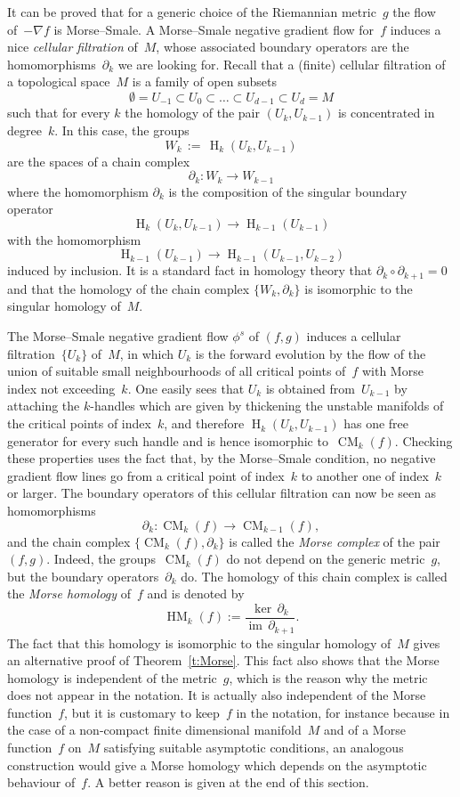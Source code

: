 \documentclass[12pt,twoside]{amsart}
\theoremstyle{plain}
\numberwithin{figure}{section}
\numberwithin{equation}{section}
\def\im{\operatorname {im}}
\def\H{\operatorname{H}}
\def\CM{\operatorname{CM}}
\def\HM{\operatorname{HM}}
\begin{document}
It can be proved that for a generic choice of the Riemannian metric~$g$ the flow of~$-\nabla f$ is Morse--Smale. A Morse--Smale negative gradient flow for~$f$ induces a nice {\em cellular filtration}\/ of~$M$, whose associated boundary operators are the homomorphisms~$\partial_k$ 
we are looking for. Recall that a (finite) cellular filtration of a topological space~$M$ is a family of open subsets 
\[
\emptyset = U_{-1} \subset U_0 \subset \dots \subset U_{d-1} \subset U_d = M
\]
such that for every $k$ the homology of the pair $(U_k,U_{k-1})$ is concentrated in degree~$k$. In this case, the groups
\[
W_k \,:=\, \H_k(U_k,U_{k-1})
\]
are the spaces of a chain complex
\[
\partial_k \colon W_k \rightarrow W_{k-1}
\]
where the homomorphism $\partial_k$ is the composition of the singular boundary operator
\[
\H_k(U_k,U_{k-1}) \rightarrow \H_{k-1}(U_{k-1})
\]
with the homomorphism
\[
\H_{k-1}(U_{k-1}) \rightarrow \H_{k-1}(U_{k-1},U_{k-2})
\]
induced by inclusion. It is a standard fact in homology theory that 
$\partial_k \circ \partial_{k+1}=0$ and that the homology of the chain complex 
$\{W_k,\partial_k\}$ is isomorphic to the singular homology of~$M$.

The Morse--Smale negative gradient flow $\phi^s$ of $(f,g)$ induces a
cellular filtration~$\{U_k\}$ of~$M$, in which $U_k$ is the forward evolution by the flow of 
the union of suitable small neighbourhoods of all critical points of~$f$ with Morse index not exceeding~$k$. One easily sees that $U_k$ is obtained from~$U_{k-1}$ by attaching the $k$-handles which are given by thickening the unstable manifolds of the critical points of index~$k$, 
and therefore $\H_k (U_k,U_{k-1})$ has one free generator for every such handle and is hence isomorphic to~$\CM_k(f)$. Checking these properties uses the fact that, by the Morse--Smale condition, no negative gradient flow lines go from a critical point of index~$k$ to another one of index~$k$ or larger. The boundary operators of this cellular filtration can now be seen as homomorphisms
\[
\partial_k \colon \CM_k(f) \rightarrow \CM_{k-1}(f),
\]
and the chain complex $\{\CM_k(f),\partial_k\}$ is called the {\em Morse complex}\/ 
of the pair~$(f,g)$. Indeed, the groups~$\CM_k(f)$ do not depend on the generic metric~$g$, 
but the boundary operators~$\partial_k$ do. The homology of this chain complex is called 
the {\em Morse homology}\/ of~$f$ and is denoted by
\[
\HM_k(f) := \frac{\ker \,\partial_k}{\im \, \partial_{k+1}}.
\] 
The fact that this homology is isomorphic to the singular homology of~$M$ gives an alternative proof of Theorem~\ref{t:Morse}. This fact also shows that the Morse homology is independent of the metric~$g$, which is the reason why the metric does not appear in the notation. 
It is actually also independent of the Morse function~$f$, but it is customary to keep~$f$ 
in the notation, for instance because in the case of a non-compact finite dimensional 
manifold~$M$ and of a Morse function~$f$ on~$M$ satisfying suitable asymptotic conditions, 
an analogous construction would give a Morse homology which depends on the asymptotic behaviour 
of~$f$. A better reason is given at the end of this section.
\end{document}
